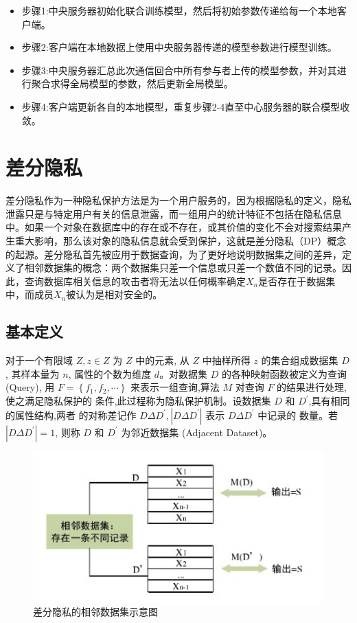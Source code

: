 \begin{itemize}
\item 步骤1:中央服务器初始化联合训练模型，然后将初始参数传递给每一个本地客户端。
\item 步骤2:客户端在本地数据上使用中央服务器传递的模型参数进行模型训练。
\item 步骤3:中央服务器汇总此次通信回合中所有参与者上传的模型参数，并对其进行聚合求得全局模型的参数，然后更新全局模型。
\item 步骤4:客户端更新各自的本地模型，重复步骤2-4直至中心服务器的联合模型收敛。
\end{itemize}


\section{差分隐私}
差分隐私作为一种隐私保护方法是为一个用户服务的，因为根据隐私的定义，隐私泄露只是与特定用户有关的信息泄露，而一组用户的统计特征不包括在隐私信息中。如果一个对象在数据库中的存在或不存在，或其价值的变化不会对搜索结果产生重大影响，那么该对象的隐私信息就会受到保护，这就是差分隐私（DP）概念的起源。差分隐私首先被应用于数据查询，为了更好地说明数据集之间的差异，定义了相邻数据集的概念：两个数据集只差一个信息或只差一个数值不同的记录。因此，查询数据库相关信息的攻击者将无法以任何概率确定$X_{n}$是否存在于数据集中，而成员$X_{n}$被认为是相对安全的。


\subsection{基本定义}
对于一个有限域 $Z, z \in Z$ 为 $Z$ 中的元素, 从 $Z$ 中抽样所得 $z$ 的集合组成数据集 $D$, 其样本量为 $n$, 属性的个数为维度 $d$。对数据集 $D$ 的各种映射函数被定义为查询 (Query), 用 $F=\left\{f_{1}, f_{2}, \cdots\right\}$ 来表示一组查询,算法 $M$ 对查询 $F$ 的结果进行处理,使之满足隐私保护的 条件,此过程称为隐私保护机制。设数据集 $D$ 和 $D^{\prime}$,具有相同的属性结构,两者 的对称差记作 $D \Delta D^{\prime},\left|D \Delta D^{\prime}\right|$ 表示 $D \Delta D^{\prime}$ 中记录的 数量。若 $\left|D \Delta D^{\prime}\right|=1$, 则称 $D$ 和 $D^{\prime}$ 为邻近数据集 (Adjacent Dataset)。
\begin{figure}[!hbt]
\centering
	\includegraphics[scale=0.7]{fig2/C2/相邻数据集示意图}%
	\caption{差分隐私的相邻数据集示意图}
	\label{fig:相邻数据集示意图}	
\end{figure}


